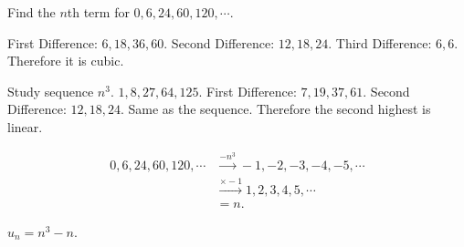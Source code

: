 \documentclass[8pt]{article}
\begin{document}
			\prob Find the \(n\)th term for \(0, 6, 24, 60, 120, \cdots\).
			
			\solution First Difference: \(6, 18, 36, 60\). Second Difference: \(12, 18, 24\). Third Difference: \(6, 6\). Therefore it is cubic.

			Study sequence \(n^3\). \(1, 8, 27, 64, 125\). First Difference: \(7, 19, 37, 61\). Second Difference: \(12, 18, 24\). Same as the sequence. Therefore the second highest is linear.

			\begin{align*}
				0, 6, 24, 60, 120, \cdots &\xrightarrow{-n^3} -1, -2, -3, -4, -5, \cdots\\
				&\xrightarrow{\times -1} 1, 2, 3, 4, 5, \cdots\\
				&= n.
			\end{align*}

			\(u_n = n^3 - n\).
\end{document}
